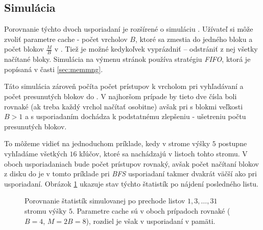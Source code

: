 \subsection{Simulácia \cache}
Porovnanie týchto dvoch usporiadaní je rozšírené o simuláciu \cache. Užívateľ si môže zvoliť parametre cache - počet vrcholov $B$, ktoré sa zmestia do jedného bloku a počet blokov $\frac{M}{B}$ v \cache. Tiež je možné \cache kedykoľvek vyprázdniť -- odstrániť z nej všetky načítané bloky. Simulácia na výmenu stránok používa stratégiu \emph{FIFO}, ktorá je popísaná v časti \ref{sec:memmng}.

Táto simulácia zároveň počíta počet prístupov k vrcholom pri vyhľadávaní a počet presunutých blokov do \cache. V najhoršom prípade by tieto dve čísla boli rovnaké (ak treba každý vrchol načítať osobitne) avšak pri \cache s blokmi veľkosti $B > 1$ a s \vEB usporiadaním dochádza k podstatnému zlepšeniu - ušetreniu počtu presunutých blokov.

To môžeme vidieť na jednoduchom príklade, kedy v strome výšky $5$ postupne vyhľadáme všetkých $16$ kľúčov, ktoré sa nachádzajú v listoch tohto stromu. V oboch usporiadaniach bude počet prístupov rovnaký, avšak počet načítaní blokov z disku do \cache je v tomto príklade pri \emph{BFS} usporiadaní takmer dvakrát väčší ako pri \vEB usporiadaní. Obrázok \ref{fig:ss_cachesim_compare} ukazuje stav týchto štatistík po nájdení posledného listu.

\begin{figure}[h]
    \centering
    \hspace{1cm}
    \caption[Porovnanie štatistík simulovanej \cache]{Porovnanie štatistík simulovanej \cache po prechode listov $1,3,\dotsc,31$ stromu výšky $5$. Parametre cache sú v oboch prípadoch rovnaké ($B=4$, $M=2B=8$), rozdiel je však v usporiadaní v pamäti.}
    \label{fig:ss_cachesim_compare}
\end{figure}

